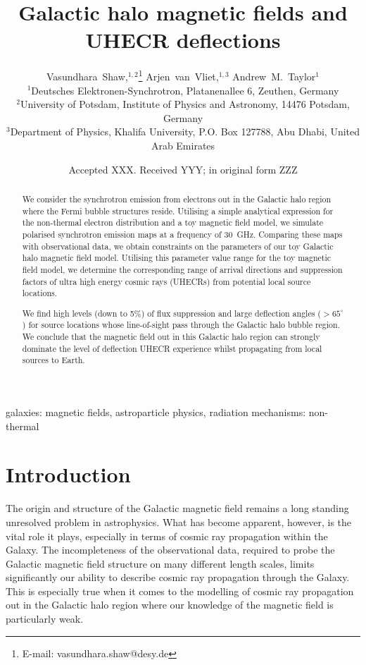 \documentclass[usenatbib]{mnras}
\title{Galactic halo magnetic fields and UHECR deflections}
\author[V.~Shaw et al.]{
Vasundhara~Shaw,$^{1,2}$\thanks{E-mail: vasundhara.shaw@desy.de}
Arjen~van~Vliet,$^{1,3}$
Andrew~M.~Taylor$^{1}$
\\
$^{1}$Deutsches Elektronen-Synchrotron, Platanenallee 6, Zeuthen, Germany \\ %
$^{2}$University of Potsdam, Institute of Physics and Astronomy, 14476 Potsdam, Germany \\
$^{3}$Department of Physics, Khalifa University, P.O. Box 127788, Abu Dhabi, United Arab Emirates
}
\date{Accepted XXX. Received YYY; in original form ZZZ}
\begin{document}
\maketitle

\begin{abstract}
We consider the synchrotron emission from electrons out in the Galactic halo region where the Fermi bubble structures reside. Utilising a simple analytical expression for the non-thermal electron distribution and a toy magnetic field model, we simulate polarised synchrotron emission maps at a frequency of 30~GHz. Comparing these maps with observational data, we obtain constraints on the parameters of our toy Galactic halo magnetic field model. Utilising this parameter value range for the toy magnetic field model, we determine the corresponding range of arrival directions and suppression factors of ultra high energy cosmic rays (UHECRs) from potential local source locations.

We find high levels (down to 5\%) of flux suppression and large deflection angles ($>65^{\circ}$) for source locations whose line-of-sight pass through the Galactic halo bubble region. We conclude that the magnetic field out in this Galactic halo region can strongly dominate the level of deflection UHECR experience whilst propagating from local sources to Earth.
\end{abstract}

\begin{keywords}
galaxies: magnetic fields, astroparticle physics, radiation mechanisms: non-thermal
\end{keywords}


\section{Introduction}
\label{Introducion}

The origin and structure of the Galactic magnetic field remains a long standing unresolved problem in astrophysics. What has become apparent, however, is the vital role it plays, especially in terms of cosmic ray propagation within the Galaxy. The incompleteness of the observational data, required to probe the Galactic magnetic field structure on many different length scales, limits significantly our ability to describe cosmic ray propagation through the Galaxy. This is especially true when it comes to the modelling of cosmic ray propagation out in the Galactic halo region where our knowledge of the magnetic field is particularly weak.
\end{document}
